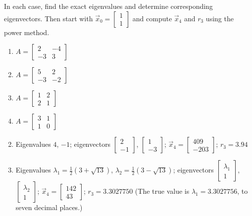 \documentclass{ximera}
\begin{document}
\begin{problem}\label{prob:employ_power}
In each case, find the exact eigenvalues and determine corresponding eigenvectors. Then start with $\vec{x}_{0} = \left[ \begin{array}{rr}
1  \\
1
\end{array}\right]$ and compute $\vec{x}_{4}$ and $r_{3}$ using the power method.


\begin{enumerate}
\item $A = \left[ \begin{array}{rr}
2 & -4 \\
-3 & 3
\end{array}\right]$
\item $A = \left[ \begin{array}{rr}
5 & 2 \\
-3 & -2
\end{array}\right]$
\item $A = \left[ \begin{array}{rr}
1 & 2 \\
2 & 1
\end{array}\right]$
\item $A = \left[ \begin{array}{rr}
3 & 1 \\
1 & 0
\end{array}\right]$
\end{enumerate}
\begin{hint}
\begin{enumerate}[label={\alph*.}]
\setcounter{enumi}{1}
\item Eigenvalues $4$, $-1$; eigenvectors
$\left[ \begin{array}{rr}
2  \\
-1
\end{array}\right]$,
$\left[ \begin{array}{rr}
1 \\
-3
\end{array}\right]$;
$\vec{x}_{4} = \left[ \begin{array}{rr}
409  \\
-203
\end{array}\right]$;
$r_{3} = 3.94$

\setcounter{enumi}{3}
\item Eigenvalues $\lambda_{1} = \frac{1}{2}(3 + \sqrt{13})$, $\lambda_{2} = \frac{1}{2}(3 - \sqrt{13})$;
eigenvectors $\left[ \begin{array}{c}
\lambda_{1}  \\
1
\end{array}\right]$,
$\left[ \begin{array}{c}
\lambda_{2}  \\
1
\end{array}\right]$;
$\vec{x}_{4} = \left[ \begin{array}{rr}
142  \\
43
\end{array}\right]$;
$r_{3} = 3.3027750$
(The true value is $\lambda_{1} = 3.3027756$, to seven decimal places.)
\end{enumerate}
\end{hint}
\end{problem}
\end{document}
